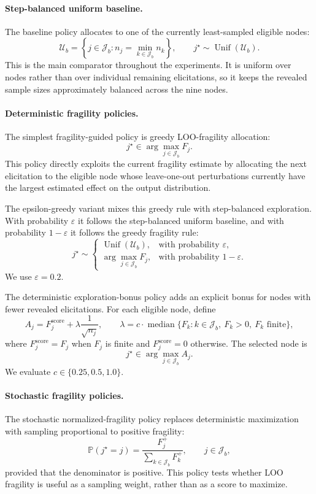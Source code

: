 \documentclass[11pt]{article}
\begin{document}
\paragraph{Step-balanced uniform baseline.}
The baseline policy allocates to one of the currently least-sampled eligible nodes:
\[
\mathcal{U}_b
=
\left\{
j\in\mathcal{J}_b:
n_j = \min_{k\in\mathcal{J}_b} n_k
\right\},
\qquad
j^\star \sim \operatorname{Unif}(\mathcal{U}_b).
\]
This is the main comparator throughout the experiments. It is uniform over nodes rather than over individual remaining elicitations, so it keeps the revealed sample sizes approximately balanced across the nine nodes.

\paragraph{Deterministic fragility policies.}
The simplest fragility-guided policy is greedy LOO-fragility allocation:
\[
j^\star \in \arg\max_{j\in\mathcal{J}_b} F_j.
\]
This policy directly exploits the current fragility estimate by allocating the next elicitation to the eligible node whose leave-one-out perturbations currently have the largest estimated effect on the output distribution.

The epsilon-greedy variant mixes this greedy rule with step-balanced exploration. With probability $\varepsilon$ it follows the step-balanced uniform baseline, and with probability $1-\varepsilon$ it follows the greedy fragility rule:
\[
j^\star \sim
\begin{cases}
\operatorname{Unif}(\mathcal{U}_b), & \text{with probability } \varepsilon,\\
\arg\max_{j\in\mathcal{J}_b} F_j, & \text{with probability } 1-\varepsilon.
\end{cases}
\]
We use $\varepsilon=0.2$.

The deterministic exploration-bonus policy adds an explicit bonus for nodes with fewer revealed elicitations. For each eligible node, define
\[
A_j
=
F_j^{\mathrm{score}}
+ \lambda\frac{1}{\sqrt{n_j}},
\qquad
\lambda
=
c\cdot \operatorname{median}\{F_k:k\in\mathcal{J}_b,\ F_k>0,\ F_k \text{ finite}\},
\]
where $F_j^{\mathrm{score}}=F_j$ when $F_j$ is finite and $F_j^{\mathrm{score}}=0$ otherwise. The selected node is
\[
j^\star \in \arg\max_{j\in\mathcal{J}_b} A_j.
\]
We evaluate $c\in\{0.25,0.5,1.0\}$.

\paragraph{Stochastic fragility policies.}
The stochastic normalized-fragility policy replaces deterministic maximization with sampling proportional to positive fragility:
\[
\mathbb{P}(j^\star=j)
=
\frac{F_j^+}{\sum_{k\in\mathcal{J}_b}F_k^+},
\qquad j\in\mathcal{J}_b,
\]
provided that the denominator is positive. This policy tests whether LOO fragility is useful as a sampling weight, rather than as a score to maximize.
\end{document}
